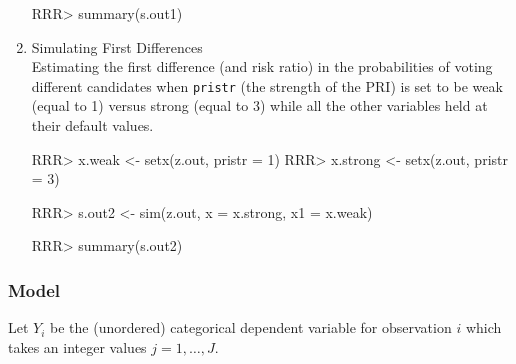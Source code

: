 \begin{enumerate}
\begin{Schunk}
\end{Schunk}
\begin{Schunk}
\begin{Sinput}
RRR> summary(s.out1)
\end{Sinput}
\end{Schunk}
\item {Simulating First Differences} \\
Estimating the first difference (and risk ratio) in the probabilities of
voting different candidates when \texttt{pristr} (the strength of the
PRI) is set to be weak (equal to 1) versus strong (equal to 3)
while all the other variables held at their default values.
\begin{Schunk}
\begin{Sinput}
RRR>  x.weak <- setx(z.out, pristr = 1)
RRR>  x.strong <- setx(z.out, pristr = 3)
\end{Sinput}
\end{Schunk}
\begin{Schunk}
\begin{Sinput}
RRR> s.out2 <- sim(z.out, x = x.strong, x1 = x.weak)
\end{Sinput}
\end{Schunk}
\begin{Schunk}
\begin{Sinput}
RRR> summary(s.out2)
\end{Sinput}
\end{Schunk}
\end{enumerate}

\subsubsection{Model}

Let $Y_{i}$ be the (unordered) categorical dependent variable for observation 
$i$ which takes an integer values $j=1, \ldots, J$.

